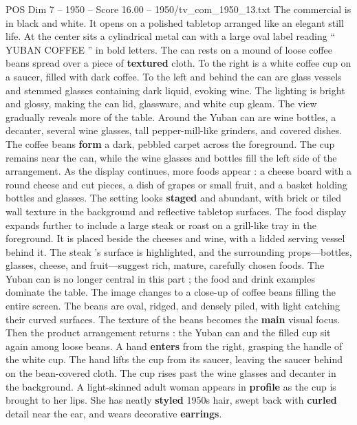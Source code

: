 \begin{textsample}{POS Dim 7 – 1950 – Score 16.00 – 1950/tv\_com\_1950\_13.txt}  \label{ex:f7_pos_013}
The commercial is in black and white.
It opens on a polished tabletop arranged like an elegant still life.
At the center sits a cylindrical metal can with a large oval label reading “ YUBAN COFFEE ” in bold letters.
The can rests on a mound of loose coffee beans spread over a piece of \textbf{textured} cloth.
To the right is a white coffee cup on a saucer, filled with dark coffee.
To the left and behind the can are glass vessels and stemmed glasses containing dark liquid, evoking wine.
The lighting is bright and glossy, making the can lid, glassware, and white cup gleam.
The view gradually reveals more of the table.
Around the Yuban can are wine bottles, a decanter, several wine glasses, tall pepper-mill-like grinders, and covered dishes.
The coffee beans \textbf{form} a dark, pebbled carpet across the foreground.
The cup remains near the can, while the wine glasses and bottles fill the left side of the arrangement.
As the display continues, more foods appear : a cheese board with a round cheese and cut pieces, a dish of grapes or small fruit, and a basket holding bottles and glasses.
The setting looks \textbf{staged} and abundant, with brick or tiled wall texture in the background and reflective tabletop surfaces.
The food display expands further to include a large steak or roast on a grill-like tray in the foreground.
It is placed beside the cheeses and wine, with a lidded serving vessel behind it.
The steak ’s surface is highlighted, and the surrounding props—bottles, glasses, cheese, and fruit—suggest rich, mature, carefully chosen foods.
The Yuban can is no longer central in this part ; the food and drink examples dominate the table.
The image changes to a close-up of coffee beans filling the entire screen.
The beans are oval, ridged, and densely piled, with light catching their curved surfaces.
The texture of the beans becomes the \textbf{main} visual focus.
Then the product arrangement returns : the Yuban can and the filled cup sit again among loose beans.
A hand \textbf{enters} from the right, grasping the handle of the white cup.
The hand lifts the cup from its saucer, leaving the saucer behind on the bean-covered cloth.
The cup rises past the wine glasses and decanter in the background.
A light-skinned adult woman appears in \textbf{profile} as the cup is brought to her lips.
She has neatly \textbf{styled} 1950s hair, swept back with \textbf{curled} detail near the ear, and wears decorative \textbf{earrings}.

\end{textsample}
